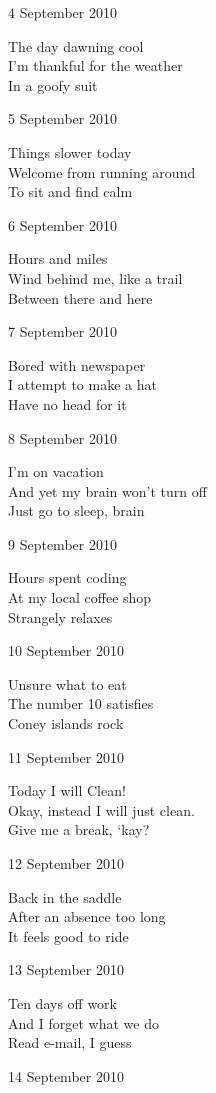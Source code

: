 \documentclass[12pt]{article}
\begin{document}
4 September 2010

The day dawning cool \\
I'm thankful for the weather \\
In a goofy suit

5 September 2010

Things slower today \\
Welcome from running around \\
To sit and find calm

6 September 2010

Hours and miles \\
Wind behind me, like a trail \\
Between there and here

7 September 2010

Bored with newspaper \\
I attempt to make a hat \\
Have no head for it

8 September 2010

I'm on vacation \\
And yet my brain won't turn off \\
Just go to sleep, brain

9 September 2010

Hours spent coding \\
At my local coffee shop \\
Strangely relaxes

\newpage

10 September 2010

Unsure what to eat \\
The number 10 satisfies \\
Coney islands rock

11 September 2010

Today I will Clean! \\
Okay, instead I will just clean. \\
Give me a break, `kay?

12 September 2010

Back in the saddle \\
After an absence too long \\
It feels good to ride

13 September 2010

Ten days off work \\
And I forget what we do \\
Read e-mail, I guess

14 September 2010
\end{document}
